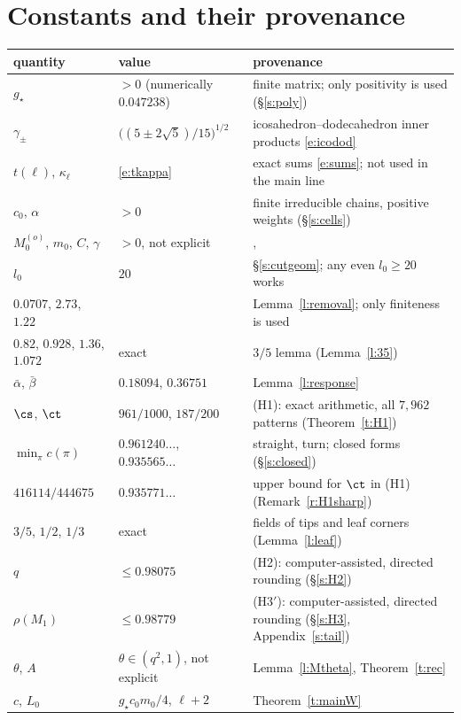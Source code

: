\section{Constants and their provenance}\label{s:constants}

\begin{center}
\begin{tabular}{>{\raggedright\arraybackslash}p{}>{\raggedright\arraybackslash}p{}>{\raggedright\arraybackslash}p{}}
quantity & value & provenance \\
\hline
$g_\star$ & $> 0$ (numerically $0.047238$) & finite matrix; only positivity is used (\S\ref{s:poly}) \\
$\gamma_\pm$ & $\bigl((5 \pm 2\sqrt5)/15\bigr)^{1/2}$ & icosahedron--dodecahedron inner products \eqref{e:icodod} \\
$t(\ell)$, $\kappa_\ell$ & \eqref{e:tkappa} & exact sums \eqref{e:sums}; not used in the main line \\
$c_0$, $\alpha$ & $> 0$ & finite irreducible chains, positive weights (\S\ref{s:cells}) \\
$M_0^{(o)}$, $m_0$, $C$, $\gamma$ & $> 0$, not explicit & \cite[Theorem~2.1]{MOS94}, \cite[Theorem~4.1]{MO94} \\
$l_0$ & $20$ & \S\ref{s:cutgeom}; any even $l_0 \ge 20$ works \\
$0.0707$, $2.73$, $1.22$ & & Lemma~\ref{l:removal}; only finiteness is used \\
$0.82$, $0.928$, $1.36$, $1.072$ & exact & $3/5$ lemma (Lemma~\ref{l:35}) \\
$\bar\alpha$, $\bar\beta$ & $0.18094$, $0.36751$ & Lemma~\ref{l:response} \\
$\cs$, $\ct$ & $961/1000$, $187/200$ & (H1): exact arithmetic, all $7{,}962$ patterns (Theorem~\ref{t:H1}) \\
$\min_\pi c(\pi)$ & $0.961240\ldots$, $0.935565\ldots$ & straight, turn; closed forms (\S\ref{s:closed}) \\
$416114/444675$ & $0.935771\ldots$ & upper bound for $\ct$ in (H1) (Remark~\ref{r:H1sharp}) \\
$3/5$, $1/2$, $1/3$ & exact & fields of tips and leaf corners (Lemma~\ref{l:leaf}) \\
$q$ & $\le 0.98075$ & (H2): computer-assisted, directed rounding (\S\ref{s:H2}) \\
$\rho(M_1)$ & $\le 0.98779$ & (H3$'$): computer-assisted, directed rounding (\S\ref{s:H3}, Appendix~\ref{s:tail}) \\
$\theta$, $A$ & $\theta \in (q^2, 1)$, not explicit & Lemma~\ref{l:Mtheta}, Theorem~\ref{t:rec} \\
$c$, $L_0$ & $g_\star c_0 m_0 / 4$, $\ell + 2$ & Theorem~\ref{t:mainW}
\end{tabular}
\end{center}

